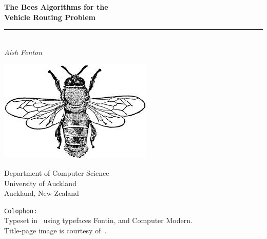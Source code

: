 

\begin{titlepage}


\vspace*{6em}

\begin{center}
   \LARGE\textbf{The Bees Algorithms for the\\ Vehicle Routing Problem\\}
   \rule{224pt}{0.75pt}\\
   \vspace*{0.75em}
   \rmfamily\large\textit{Aish Fenton}
\end{center}

\hspace{70pt}\includegraphics[scale=0.15, angle=315]{images/bee.jpeg}

\vfill
\small\rmfamily
\begin{flushright}
Department of Computer Science\\
University of Auckland \\
Auckland, New Zealand 
\end{flushright}

\end{titlepage}

\texttt{Colophon:}\\
Typeset in \XeTeX\ using typefaces  Fontin, \rmfamily and Computer Modern.\\
Title-page image is courtesy of~\cite{beeimage}.
